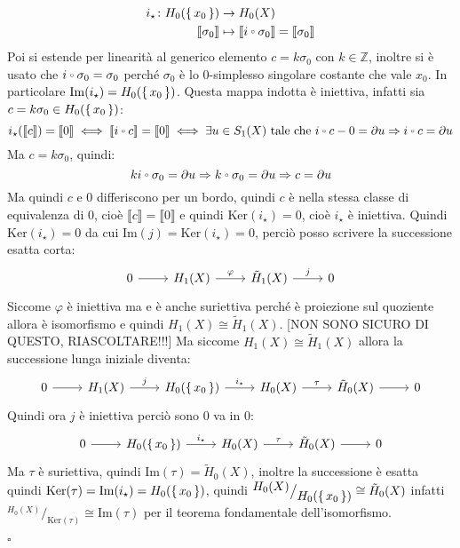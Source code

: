 \documentclass[10pt, twoside=false, x11names]{scrbook}
\newenvironment{proof}{{\textbf{Dimostrazione}:}}{\hfill $\square$}
\newcommand{\Z}{\mathbb{Z}}
\newcommand{\im}[1]{\mathrm{Im}( #1 )}
\renewcommand{\ker}[1]{\mathrm{Ker}( #1)}
\newcommand*\quot[2]{{^{\textstyle #1}\big/_{\textstyle #2}}}
\let\latexcirc=\circ
\newcommand{\ccirc}{\mathbin{\mathchoice
  {\xcirc\scriptstyle}
  {\xcirc\scriptstyle}
  {\xcirc\scriptscriptstyle}
  {\xcirc\scriptscriptstyle}
}}
\newcommand{\xcirc}[1]{\vcenter{\hbox{$#1\latexcirc$}}}
\let\circ\ccirc
\let\phi\varphi
\begin{document}
\begin{proof}
  \begin{align*}
    i_\star \colon H_0(\set{x_0}) & \to H_0(X) \\
    \llbracket\sigma_0\rrbracket & \mapsto \llbracket i \circ \sigma_0 \rrbracket = \llbracket \sigma_0 \rrbracket
  \end{align*}
  Poi si estende per linearità al generico elemento $ c = k \sigma_0 $ con $ k \in \Z $, inoltre
  si è usato che $ i \circ \sigma_0 = \sigma_0 $ perché $ \sigma_0 $ è lo $ 0 $-simplesso singolare
  costante che vale $ x_0 $. In particolare $ \im{i_\star} = H_0(\set{x_0}) $.
  Questa mappa indotta è iniettiva, infatti sia  $ c = k \sigma_0 \in H_0(\set{x_0}) $:
  \[
    i_\star(\llbracket c \rrbracket) = \llbracket 0 \rrbracket \iff \llbracket i \circ c \rrbracket = \llbracket 0 \rrbracket \iff \exists u \in S_1(X) \text{ tale che } i \circ c - 0 = \partial u \Rightarrow i \circ c = \partial u
  \]
  Ma $ c = k \sigma_0 $, quindi:
  \[
    k i \circ \sigma_0 = \partial u \Rightarrow k \circ \sigma_0 = \partial u \Rightarrow c = \partial u
  \]
  Ma quindi $ c $ e $ 0 $ differiscono per un bordo, quindi $ c $ è nella stessa classe
  di equivalenza di $ 0 $, cioè $ \llbracket c \rrbracket = \llbracket 0 \rrbracket $ e quindi $ \ker{i_\star} = 0 $, cioè $ i_\star $ è
  iniettiva.
  Quindi $ \ker{i_\star} = 0 $ da cui $ \im{j} = \ker{i_\star} = 0 $, perciò posso scrivere
  la successione esatta corta:
  \[
    \begin{tikzcd}
      0 \rar & H_1(X) \rar{\phi} & \tilde{H}_1(X) \rar{j} & 0
    \end{tikzcd}
  \]
  Siccome $ \phi $ è iniettiva ma e è anche suriettiva perché è proiezione
  sul quoziente allora è isomorfismo e quindi $ H_1(X) \cong \tilde{H}_1(X) $.
  [NON SONO SICURO DI QUESTO, RIASCOLTARE!!!]
  Ma siccome $ H_1(X) \cong \tilde{H}_1(X) $ allora la successione lunga iniziale diventa:
  \[
    \begin{tikzcd}
      0 \rar & H_1(X) \arrow{r}{j} & H_0(\set{x_0}) \arrow{r}{i_\star} &  H_0(X) \arrow{r}{\tau} & \tilde{H}_0(X) \arrow{r}{} & 0
    \end{tikzcd}
  \]
  Quindi ora $ j $ è iniettiva perciò sono $ 0 $ va in $ 0 $:
  \[
    \begin{tikzcd}
      0 \rar & H_0(\set{x_0}) \arrow{r}{i_\star} &  H_0(X) \arrow{r}{\tau} & \tilde{H}_0(X) \arrow{r}{} & 0
    \end{tikzcd}
  \]
  Ma $ \tau $ è suriettiva, quindi $ \im{\tau} = \tilde{H}_0(X) $, inoltre la successione è esatta
  quindi $ \ker{\tau} = \im{i_\star} = H_0(\set{x_0}) $, quindi $ \quot{H_0(X)}{H_0(\set{x_0})} \cong \tilde{H}_0(X) $
  infatti $ \quot{H_0(X)}{\ker{\tau}} \cong \im{\tau} $
  per il teorema fondamentale dell'isomorfismo.


\end{proof}
\end{document}
